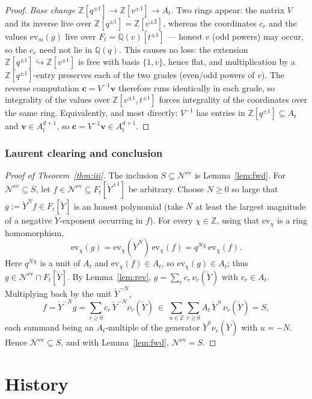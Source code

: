 \documentclass[11pt]{article}
\newcommand{\At}{A_t}
\newcommand{\Ft}{F_t}
\newcommand{\Nev}{\mathcal N^{\mathrm{ev}}}
\newcommand{\Yc}{\check Y}
\newcommand{\Z}{\mathbb Z}
\newcommand{\ev}{\mathrm{ev}}
\begin{document}
\begin{proof}
\smallskip
\emph{Base change $\Z[q^{\pm1}]\to\Z[v^{\pm1}]\to\At$.}\;
Two rings appear: the matrix $V$ and its inverse live over
$\Z[q^{\pm1}]=\Z[v^{\pm2}]$, whereas the coordinates $c_r$ and the values
$\ev_m(g)$ live over $\Ft=\mathbb Q(v)[t^{\pm1}]$ --- honest $v$ (odd powers) may
occur, so the $c_r$ need not lie in $\mathbb Q(q)$. This causes no loss: the
extension $\Z[q^{\pm1}]\hookrightarrow\Z[v^{\pm1}]$ is free with basis
$\{1,v\}$, hence flat, and multiplication by a $\Z[q^{\pm1}]$-entry preserves
each of the two grades (even/odd powers of $v$). The reverse computation
$\mathbf c=V^{-1}\mathbf v$ therefore runs identically in each grade, so
integrality of the values over $\Z[v^{\pm1},t^{\pm1}]$ forces integrality of the
coordinates over the same ring. Equivalently, and most directly:
$V^{-1}$ has entries in $\Z[q^{\pm1}]\subseteq\At$ and $\mathbf v\in\At^{d+1}$,
so $\mathbf c=V^{-1}\mathbf v\in\At^{d+1}$.
\end{proof}

\subsubsection{Laurent clearing and conclusion}

\begin{proof}[Proof of Theorem~\ref{thm:iii}]
The inclusion $S\subseteq\Nev$ is Lemma~\ref{lem:fwd}. For $\Nev\subseteq S$,
let $f\in\Nev\subseteq\Ft[\Yc^{\pm1}]$ be arbitrary. Choose $N\ge0$ so large that
$g:=\Yc^{N}f\in\Ft[\Yc]$ is an honest polynomial (take $N$ at least the largest
magnitude of a negative $\Yc$-exponent occurring in $f$). For every $\chi\in\Z$,
using that $\ev_\chi$ is a ring homomorphism,
\[
  \ev_\chi(g)=\ev_\chi(\Yc^{N})\,\ev_\chi(f)=q^{N\chi}\,\ev_\chi(f).
\]
Here $q^{N\chi}$ is a unit of $\At$ and $\ev_\chi(f)\in\At$, so
$\ev_\chi(g)\in\At$; thus $g\in\Nev\cap\Ft[\Yc]$. By Lemma~\ref{lem:rev},
$g=\sum_{r}c_r\,\nu_r(\Yc)$ with $c_r\in\At$. Multiplying back by the unit
$\Yc^{-N}$,
\[
  f=\Yc^{-N}g=\sum_{r\ge0}c_r\,\Yc^{-N}\nu_r(\Yc)
   \ \in\ \sum_{u\in\Z}\sum_{r\ge0}\At\,\Yc^{\,u}\,\nu_r(\Yc)=S,
\]
each summand being an $\At$-multiple of the generator $\Yc^{u}\nu_r(\Yc)$ with
$u=-N$. Hence $\Nev\subseteq S$, and with Lemma~\ref{lem:fwd}, $\Nev=S$.
\end{proof}

\section{History}
\end{document}

